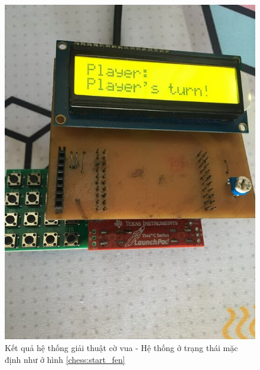 \begin{figure}[ht]
\centering
\includegraphics[scale=0.3]{images/chess_init.jpg}
\caption{Kết quả hệ thống giải thuật cờ vua - Hệ thống ở trạng thái mặc định như ở hình \ref{chess:start_fen}}
\label{fig:chess_init}
\end{figure}

